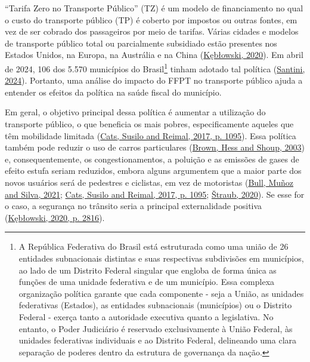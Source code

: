 \documentclass[12pt, a4paper, twoside]{article}
\numberwithin{equation}{subsection} %
\begin{document}
``Tarifa Zero no Transporte Público'' (TZ) é um modelo de financiamento
no qual o custo do transporte público (TP) é coberto por impostos ou
outras fontes, em vez de ser cobrado dos passageiros por meio de
tarifas. Várias cidades e modelos de transporte público total ou
parcialmente subsidiado estão presentes nos Estados Unidos, na Europa,
na Austrália e na China
(\protect\hyperlink{ref-keblowski_why_2020}{Kębłowski, 2020}). Em abril
de 2024, 106 dos 5.570 municípios do Brasil\footnote{A República
  Federativa do Brasil está estruturada como uma união de 26 entidades
  subnacionais distintas e suas respectivas subdivisões em municípios,
  ao lado de um Distrito Federal singular que engloba de forma única as
  funções de uma unidade federativa e de um município. Essa complexa
  organização política garante que cada componente - seja a União, as
  unidades federativas (Estados), as entidades subnacionais (municípios)
  ou o Distrito Federal - exerça tanto a autoridade executiva quanto a
  legislativa. No entanto, o Poder Judiciário é reservado exclusivamente
  à União Federal, às unidades federativas individuais e ao Distrito
  Federal, delineando uma clara separação de poderes dentro da estrutura
  de governança da nação.} tinham adotado tal política
(\protect\hyperlink{ref-Santini-FFPT-2024}{Santini, 2024}). Portanto,
uma análise do impacto do FFPT no transporte público ajuda a entender os
efeitos da política na saúde fiscal do município.

Em geral, o objetivo principal dessa política é aumentar a utilização do
transporte público, o que beneficia os mais pobres, especificamente
aqueles que têm mobilidade limitada
(\protect\hyperlink{ref-cats_prospects_2017}{Cats, Susilo and Reimal,
2017, p. 1095}). Essa política também pode reduzir o uso de carros
particulares (\protect\hyperlink{ref-Brown_2003}{Brown, Hess and Shoup,
2003}) e, consequentemente, os congestionamentos, a poluição e as
emissões de gases de efeito estufa seriam reduzidos, embora alguns
argumentem que a maior parte dos novos usuários será de pedestres e
ciclistas, em vez de motoristas
(\protect\hyperlink{ref-BULL-RCT-2021}{Bull, Muñoz and Silva, 2021};
\protect\hyperlink{ref-cats_prospects_2017}{Cats, Susilo and Reimal,
2017, p. 1095}; \protect\hyperlink{ref-straub_2020}{Štraub, 2020}). Se
esse for o caso, a segurança no trânsito seria a principal externalidade
positiva (\protect\hyperlink{ref-keblowski_why_2020}{Kębłowski, 2020, p.
2816}).
\end{document}
